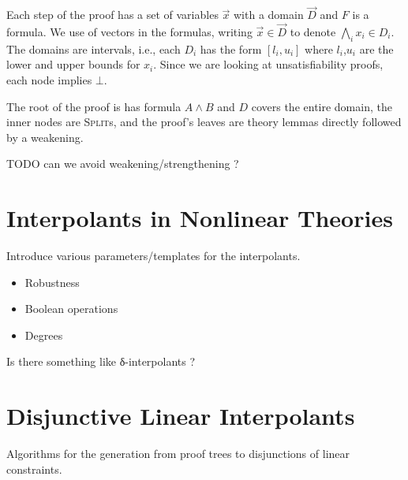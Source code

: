 \documentclass{acm_proc_article-sp}
\begin{document}
Each step of the proof has a set of variables $\vec x$ with a domain $\vec D$ and $F$ is a formula.
We use of vectors in the formulas, writing $\vec x ∈ \vec D$ to denote $\bigwedge_i x_i ∈ D_i$.
The domains are intervals, i.e., each $D_i$ has the form $[l_i,u_i]$ where $l_i$,$u_i$ are the lower and upper bounds for $x_i$.
Since we are looking at unsatisfiability proofs, each node implies $⊥$.

The root of the proof is has formula $A ∧ B$ and $D$ covers the entire domain,
the inner nodes are \textsc{Split}s,
and the proof's leaves are theory lemmas directly followed by a weakening.

\begin{mathpar}


\end{mathpar}
TODO can we avoid weakening/strengthening ?

\section{Interpolants in Nonlinear Theories}

Introduce various parameters/templates for the interpolants. 
\begin{itemize}
	\item Robustness
	\item Boolean operations
	\item Degrees 
\end{itemize}

Is there something like δ-interpolants ?


\section{Disjunctive Linear Interpolants}

Algorithms for the generation from proof trees to disjunctions of linear constraints. 
\end{document}
